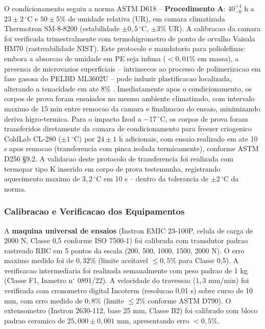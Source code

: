\documentclass[11pt,a4paper,oneside]{article}
\begin{document}
O condicionamento seguiu a norma ASTM D618 -- {\bfseries Procedimento A}: $40^{+4}_{-0}$ h a
$23{\pm}2\,^{\circ}$C e $50{\pm}5\%$ de umidade relativa (UR), em camara climatizada Thermotron
SM-8-8200 (estabilidade $\pm0{,}5\,^{\circ}$C, $\pm3\%$ UR). A calibracao da camara foi verificada
trimestralmente com termohigrometro de ponto de orvalho Vaisala HM70 (rastreabilidade NIST).
Este protocolo e mandatorio para poliolefinas: embora a absorcao de umidade em PE seja infima
($<0{,}01\%$ em massa), a presenca de microvazios superficiais -- intrinsecos ao processo de
polimerizacao em fase gasosa do PELBD ML3602U -- pode induzir plastificacao localizada, alterando
a tenacidade em ate 8\% \cite{Coutinho2003}. Imediatamente apos o condicionamento, os corpos
de prova foram ensaiados no mesmo ambiente climatizado, com intervalo maximo de 15 min entre
remocao da camara e finalizacao do ensaio, minimizando deriva higro-termica. Para o impacto Izod
a $-$17$\,^{\circ}$C, os corpos de prova foram transferidos diretamente da camara de
condicionamento para freezer criogenico ColdLab CL-280 ($\pm1\,^{\circ}$C) por $24{\pm}1$ h
adicionais, com ensaio realizado em ate 10 s apos remocao (transferencia com pinca isolada
termicamente), conforme ASTM D256 \S9.2. A validacao deste protocolo de transferencia foi
realizada com termopar tipo K inserido em corpo de prova testemunha, registrando aquecimento
maximo de $3{,}2\,^{\circ}$C em 10 s -- dentro da tolerancia de $\pm2\,^{\circ}$C da norma.

\subsubsection{Calibracao e Verificacao dos Equipamentos}

A {\bfseries maquina universal de ensaios} (Instron EMIC 23-100P, celula de carga de 2000 N,
Classe 0,5 conforme ISO 7500-1) foi calibrada com transdutor padrao rastreado RBC em 5 pontos
da escala (200, 500, 1000, 1500, 2000 N). O erro maximo medido foi de $0{,}32\%$ (limite
aceitavel $\le0{,}5\%$ para Classe 0,5). A verificacao intermediaria foi realizada semanalmente
com peso padrao de 1 kg (Classe F1, Inmetro n$^{\circ}$ 0891/22). A velocidade do travessao
($1{,}3$ mm/min) foi verificada com cronometro digital Incoterm (resolucao 0,01 s) sobre curso
de 10 mm, com erro medido de $0{,}8\%$ (limite $\le2\%$ conforme ASTM D790). O extensometro
(Instron 2630-112, base 25 mm, Classe B2) foi calibrado com bloco padrao ceramico de
$25{,}000{\pm}0{,}001$ mm, apresentando erro $<0{,}5\%$.
\end{document}
